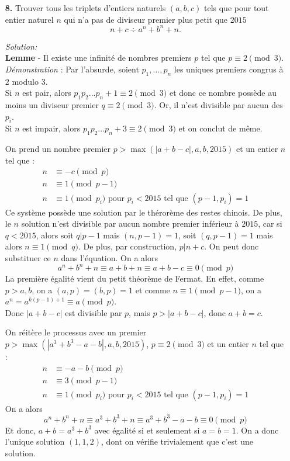 \documentclass[language=german,style=solution]{smo}
\begin{document}
\begin{enumerate}
\newpage

\item[\textbf{8.}] %
Trouver tous les triplets d'entiers naturels $(a,b,c)$ tels que pour tout entier naturel $n$ qui n'a pas de diviseur premier plus petit que $2015$
\[
n+c \div a^n+b^n+n.
\]

\textit{Solution:}\\
\textbf{Lemme} - Il existe une infinité de nombres premiers $p$ tel que $p\equiv 2 \pmod 3$.\\
\textit{Démonstration} : Par l'absurde, soient $p_1,...,p_n$ les uniques premiers congrus à $2$ modulo $3$. \\
Si $n$ est pair, alors $p_1p_2...p_n+1\equiv 2 \pmod 3$ et donc ce nombre possède au moins un diviseur premier $q\equiv 2\pmod 3$. Or, il n'est divisible par aucun des $p_i$.\\
Si $n$ est impair, alors $p_1p_2...p_n+3\equiv 2 \pmod 3$ et on conclut de même.

On prend un nombre premier $p>\max(|a+b-c|,a,b,2015)$ et un entier $n$ tel que :
\begin{align*}
n &\equiv -c \pmod p \\
n &\equiv 1 \pmod {p-1} \\
n &\equiv 1 \pmod {p_i} \text{ pour } p_i<2015 \text{ tel que } (p-1,p_i)=1
\end{align*}
Ce système possède une solution par le thérorème des restes chinois. De plus, le $n$ solution n'est divisible par aucun nombre premier inférieur à $2015$, car si $q<2015$, alors soit $q|p-1$ mais $(n,p-1)=1$, soit $(q,p-1)=1$ mais alors $n \equiv 1 \pmod {q}$. De plus, par construction, $p|n+c$. On peut donc substituer ce $n$ dans l'équation. On a alors 
\[
a^n+b^n+n \equiv a+b+n \equiv a+b-c \equiv 0 \pmod p
\]
La première égalité vient du petit théorème de Fermat. En effet, comme $p>a,b$, on a $(a,p)=(b,p)=1$ et comme $n \equiv 1 \pmod {p-1}$, on a $a^n=a^{k(p-1)+1} \equiv a \pmod p$.\\
Donc $|a+b-c|$ est divisible par $p$, mais $p>|a+b-c|$, donc $a+b=c$.

On réitère le processus avec un premier $p>\max(|a^3+b^3-a-b|,a,b,2015)$, $p\equiv 2 \pmod 3$ et un entier $n$ tel que :
\begin{align*}
n &\equiv -a-b \pmod p \\
n &\equiv 3 \pmod {p-1} \\
n &\equiv 1 \pmod {p_i} \text{ pour } p_i<2015 \text{ tel que } (p-1,p_i)=1
\end{align*}
On a alors
\[
  a^n+b^n+n \equiv a^3+b^3+n \equiv a^3+b^3-a-b \equiv 0 \pmod p
\]
Et donc, $a+b=a^3+b^3$ avec égalité si et seulement si $a=b=1$. On a donc l'unique solution $(1,1,2)$, dont on vérifie trivialement que c'est une solution.


\end{enumerate}
\end{document}
